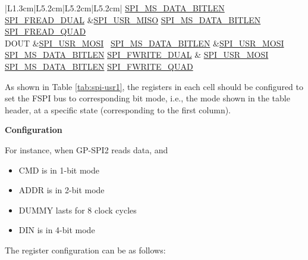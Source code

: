 \documentclass[main\_\_EN.tex]{subfiles}
\begin{document}
\begin{landscape}
\begin{longtable}[c]{ |L{1.3cm}|L{5.2cm}|L{5.2cm}|L{5.2cm}| }
     \hyperref[fielddesc:SPIMSDATABITLEN]{SPI\_MS\_DATA\_BITLEN}
    \hyperref[fielddesc:SPIFREADDUAL]{SPI\_FREAD\_DUAL}
     &\hyperref[fielddesc:SPIUSRMISO]{SPI\_USR\_MISO}
     \hyperref[fielddesc:SPIMSDATABITLEN]{SPI\_MS\_DATA\_BITLEN}
    \hyperref[fielddesc:SPIFREADQUAD]{SPI\_FREAD\_QUAD}\\
     \hline
DOUT &\hyperref[fielddesc:SPIUSRMOSI]{SPI\_USR\_MOSI}       \
      \hyperref[fielddesc:SPIMSDATABITLEN]{SPI\_MS\_DATA\_BITLEN}
     &\hyperref[fielddesc:SPIUSRMOSI]{SPI\_USR\_MOSI}
     \hyperref[fielddesc:SPIMSDATABITLEN]{SPI\_MS\_DATA\_BITLEN}      \hyperref[fielddesc:SPIFWRITEDUAL]{SPI\_FWRITE\_DUAL} &
    \hyperref[fielddesc:SPIUSRMOSI]{SPI\_USR\_MOSI}
     \hyperref[fielddesc:SPIMSDATABITLEN]{SPI\_MS\_DATA\_BITLEN}      \hyperref[fielddesc:SPIFWRITEQUAD]{SPI\_FWRITE\_QUAD} \\
     \hline
\end{longtable}
\end{landscape}

As shown in Table \ref{tab:spi-usr1}, the registers in each cell should be configured to set the FSPI bus to corresponding bit mode, i.e., the mode shown in the table header, at a specific state (corresponding to the first column).

\textbf{Configuration}

For instance, when GP-SPI2 reads data, and
\begin{itemize}
    \item CMD is in 1-bit mode
    \item ADDR is in 2-bit mode
    \item DUMMY lasts for 8 clock cycles
    \item DIN is in 4-bit mode
\end{itemize}
The register configuration can be as follows:
\end{document}
